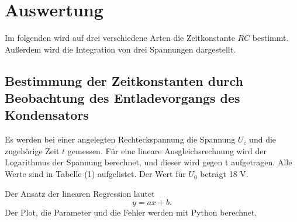 \section{Auswertung}
\label{sec:Auswertung}

Im folgenden wird auf drei verschiedene Arten die Zeitkonstante $RC$ bestimmt. 
Außerdem wird die Integration von drei Spannungen dargestellt.

\subsection{Bestimmung der Zeitkonstanten durch Beobachtung des Entladevorgangs des Kondensators}
Es werden bei einer angelegten Rechteckspannung die Spannung $U_c$ und die zugehörige Zeit $t$ gemessen.
Für eine lineare Ausgleichsrechnung wird der Logarithmus der Spannung berechnet, und dieser wird gegen t aufgetragen.
Alle Werte sind in Tabelle (1) aufgelistet. Der Wert für $U_0$ beträgt 18 V.

\noindent Der Ansatz der linearen Regression lautet
\begin{equation}
    y = ax+b .
\end{equation}
Der Plot, die Parameter und die Fehler werden mit Python berechnet.

